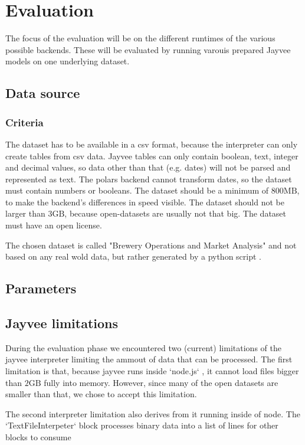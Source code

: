 \chapter{Evaluation}
\label{chapter:Evaluation}

The focus of the evaluation will be on the different runtimes of the various possible backends. These will be evaluated by running varouis prepared Jayvee models on one underlying dataset.

\section{Data source}
\label{section:data_source}

\subsection{Criteria}
\label{subsection:data_source_criteria}
The dataset has to be available in a csv format, because the interpreter can only create tables from csv data.
Jayvee tables can only contain boolean, text, integer and decimal values, so data other than that (e.g. dates) will not be parsed and represented as text.
The polars backend cannot transform dates, so the dataset must contain numbers or booleans.
The dataset should be a minimum of $800\text{MB}$, to make the backend's differences in speed visible.
The dataset should not be larger than $3\text{GB}$, because open-datasets are usually not that big. %
The dataset must have an open license.%

The chosen dataset is called "Brewery Operations and Market Analysis" and not based on any real wold data, but rather generated by a python script \autocite{dataset}.






\section{Parameters}
\label{section:parameters}

\section{Jayvee limitations}
\label{section:jv_limits}

During the evaluation phase we encountered two (current) limitations of the jayvee interpreter limiting %
the ammout of data that can be processed. The first limitation %
is that, because jayvee runs inside `node.js` %
, it cannot load files bigger than $2\text{GB}$ fully into memory.
However, since many of the open datasets are smaller than that, %
we chose to accept this limitation.

The second interpreter limitation also derives from it running inside of node.
The `TextFileInterpeter` %
block processes binary data into a list of lines for other blocks to consume
